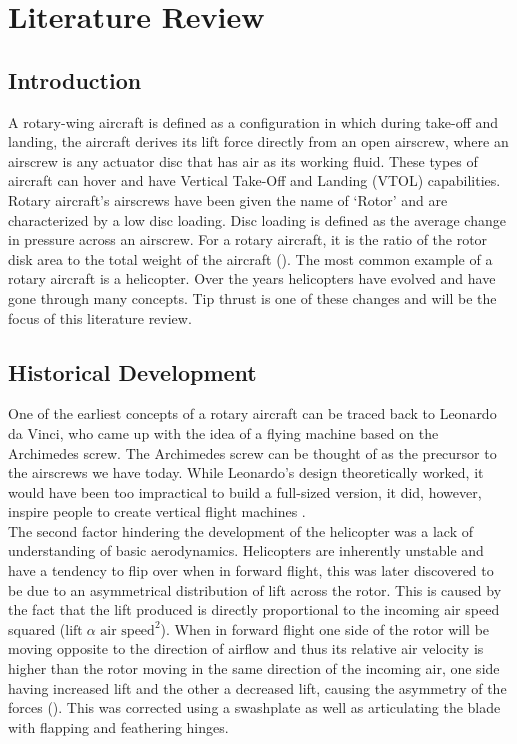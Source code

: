 \chapter{Literature Review}
\label{sec: Literature_review}
\section{Introduction}
    A rotary-wing aircraft is defined as a configuration in which during take-off and landing, the aircraft derives its lift force directly from an open airscrew, where an airscrew is any actuator disc that has air as its working fluid. These types of aircraft can hover and have Vertical Take-Off and Landing (VTOL) capabilities. Rotary aircraft's airscrews have been given the name of `Rotor' and are characterized by a low disc loading. Disc loading is defined as the average change in pressure across an airscrew. For a rotary aircraft, it is the ratio of the rotor disk area to the total weight of the aircraft (\cite{stepniewski1984rotary}). The most common example of a rotary aircraft is a helicopter. Over the years helicopters have evolved and have gone through many concepts. Tip thrust is one of these changes and will be the focus of this literature review. 

\section{Historical Development}
    One of the earliest concepts of a rotary aircraft can be traced back to Leonardo da Vinci, who came up with the idea of a flying machine based on the Archimedes screw. The Archimedes screw can be thought of as the precursor to the airscrews we have today. While Leonardo's design theoretically worked, it would have been too impractical to build a full-sized version, it did, however, inspire people to create vertical flight machines \citep{stepniewski1984rotary}.\\

    The second factor hindering the development of the helicopter was a lack of understanding of basic aerodynamics. Helicopters are inherently unstable and have a tendency to flip over when in forward flight, this was later discovered to be due to an asymmetrical distribution of lift across the rotor. This is caused by the fact that the lift produced is directly proportional to the incoming air speed squared (\(\text{lift}\;\alpha \text{ air speed}^2\)). When in forward flight one side of the rotor will be moving opposite to the direction of airflow and thus its relative air velocity is higher than the rotor moving in the same direction of the incoming air, one side having increased lift and the other a decreased lift, causing the asymmetry of the forces (\cite{anderson2010helicopters}). This was corrected using a swashplate as well as articulating the blade with flapping and feathering hinges.\\
    

